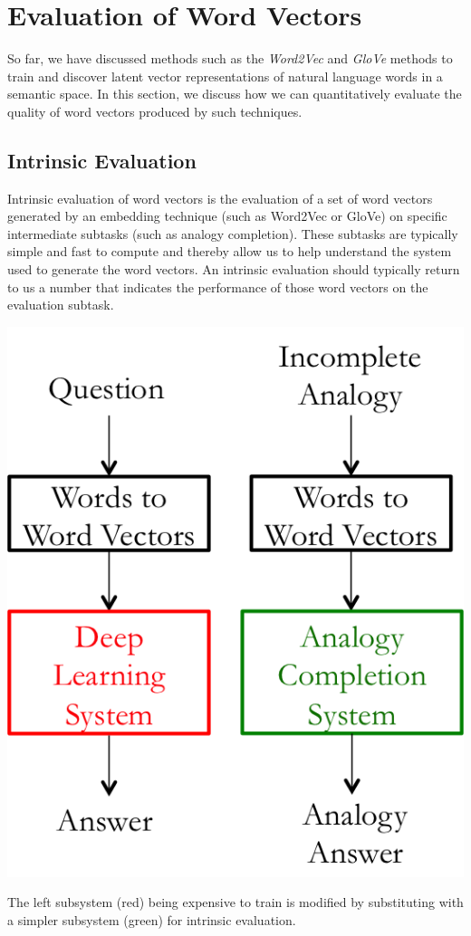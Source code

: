 \documentclass{tufte-handout}
\begin{document}
\section{Evaluation of Word Vectors}\label{sec:eval-wv}

So far, we have discussed methods such as the \textit{Word2Vec} and \textit{GloVe} methods to train and discover latent vector representations of natural language words in a semantic space. In this section, we discuss how we can quantitatively evaluate the quality of word vectors produced by such techniques.

\subsection{Intrinsic Evaluation}\label{sec:intrinsic}
Intrinsic evaluation of word vectors is the evaluation of a set of word vectors generated by an embedding technique (such as Word2Vec or GloVe) on specific intermediate subtasks (such as analogy completion). These subtasks are typically simple and fast to compute and thereby allow us to help understand the system used to generate the word vectors. An intrinsic evaluation should typically return to us a number that indicates the performance of those word vectors on the evaluation subtask. 

\begin{marginfigure}%
  \includegraphics[width=\linewidth]{IntrinsicEval}
  \caption{The left subsystem (red) being expensive to train is modified by substituting with a simpler subsystem (green) for intrinsic evaluation.}
  \label{fig:IntrinsicEval}
\end{marginfigure}
\end{document}
